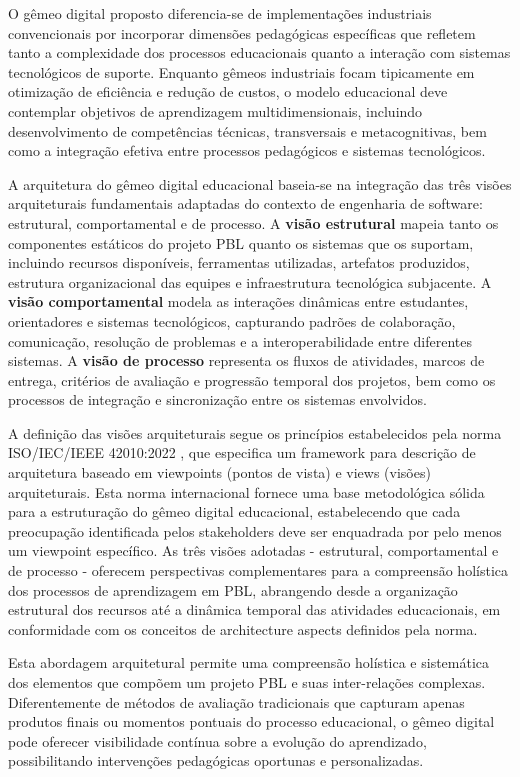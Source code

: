 \documentclass[12pt,a4paper]{article}
\begin{document}
O gêmeo digital proposto diferencia-se de
implementações industriais convencionais por incorporar dimensões pedagógicas
específicas que refletem tanto a complexidade dos processos educacionais quanto
a interação com sistemas tecnológicos de suporte. Enquanto gêmeos industriais
focam tipicamente em otimização de eficiência e redução de custos, o modelo
educacional deve contemplar objetivos de aprendizagem multidimensionais,
incluindo desenvolvimento de competências técnicas, transversais e
metacognitivas, bem como a integração efetiva entre processos pedagógicos e
sistemas tecnológicos.

A arquitetura do gêmeo digital educacional baseia-se na integração das três
visões arquiteturais fundamentais adaptadas do contexto de engenharia de
software: estrutural, comportamental e de processo. A \textbf{visão estrutural}
mapeia tanto os componentes estáticos do projeto PBL quanto os sistemas que os
suportam, incluindo recursos disponíveis, ferramentas utilizadas, artefatos
produzidos, estrutura organizacional das equipes e infraestrutura tecnológica
subjacente. A \textbf{visão comportamental} modela as interações dinâmicas
entre estudantes, orientadores e sistemas tecnológicos, capturando padrões de
colaboração, comunicação, resolução de problemas e a interoperabilidade entre
diferentes sistemas. A \textbf{visão de processo} representa os fluxos de
atividades, marcos de entrega, critérios de avaliação e progressão temporal dos
projetos, bem como os processos de integração e sincronização entre os sistemas
envolvidos.

A definição das visões arquiteturais segue os princípios estabelecidos pela
norma ISO/IEC/IEEE 42010:2022 \cite{iso42010}, que especifica um framework para
descrição de arquitetura baseado em viewpoints (pontos de vista) e views
(visões) arquiteturais. Esta norma internacional fornece uma base metodológica
sólida para a estruturação do gêmeo digital educacional, estabelecendo que cada
preocupação identificada pelos stakeholders deve ser enquadrada por pelo menos
um viewpoint específico. As três visões adotadas - estrutural, comportamental e
de processo - oferecem perspectivas complementares para a compreensão holística
dos processos de aprendizagem em PBL, abrangendo desde a organização estrutural
dos recursos até a dinâmica temporal das atividades educacionais, em
conformidade com os conceitos de architecture aspects definidos pela norma.

Esta abordagem arquitetural permite uma compreensão holística e sistemática dos
elementos que compõem um projeto PBL e suas inter-relações complexas.
Diferentemente de métodos de avaliação tradicionais que capturam apenas
produtos finais ou momentos pontuais do processo educacional, o gêmeo digital
pode oferecer visibilidade contínua sobre a evolução do aprendizado,
possibilitando intervenções pedagógicas oportunas e personalizadas.
\end{document}
